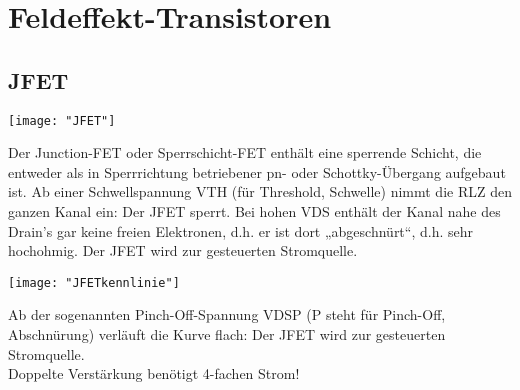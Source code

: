 \section{Feldeffekt-Transistoren}
\subsection{JFET}
\begin{minipage}[t]{0.3\textwidth}
	\vspace{0pt}								%
	\texttt{[image: "JFET"]}
\end{minipage}\hspace{0.05\textwidth}
\begin{minipage}[t]{0.65\textwidth}
	\vspace{0pt}								%
	Der Junction-FET oder Sperrschicht-FET enthält eine sperrende Schicht, die entweder als in
	Sperrrichtung betriebener pn- oder Schottky-Übergang aufgebaut ist.
	Ab einer Schwellspannung VTH (für Threshold, Schwelle) nimmt die RLZ den ganzen Kanal ein:
	Der JFET sperrt. Bei hohen VDS enthält der Kanal nahe des Drain's gar keine freien Elektronen,
	d.h. er ist dort „abgeschnürt“, d.h. sehr hochohmig. Der JFET wird zur gesteuerten
	Stromquelle. \\
\end{minipage}
\vspace{2mm}

\begin{minipage}[t]{0.3\textwidth}
	\vspace{0pt}								%
	\texttt{[image: "JFETkennlinie"]}
\end{minipage}\hspace{0.05\textwidth}
\begin{minipage}[t]{0.65\textwidth}
	\vspace{0pt}								%
	Ab der sogenannten Pinch-Off-Spannung VDSP (P steht für Pinch-Off, Abschnürung) verläuft die
	Kurve flach: Der JFET wird zur gesteuerten Stromquelle.\\
	
	Doppelte Verstärkung benötigt 4-fachen Strom!
\end{minipage}
\vspace{2mm}



